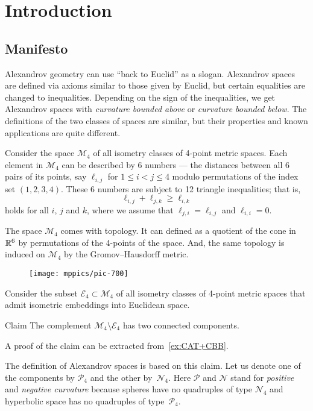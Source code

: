 \chapter{Introduction}

\section{Manifesto}

Alexandrov geometry can use ``back to Euclid'' as a slogan.
Alexandrov spaces are defined via axioms similar to those given by Euclid,
but certain  equalities are changed to inequalities. 
Depending on the sign of the inequalities, we get Alexandrov spaces with {}\emph{curvature bounded above} or {}\emph{curvature bounded below}.
The definitions of the two classes of spaces are similar, but their properties and known applications are quite different.


Consider the space $\mathcal{M}_4$ of all isometry classes of 4-point metric spaces.
Each element in $\mathcal{M}_4$ can be described by 6 numbers 
 --- the distances between all 6 pairs of its points, say $\ell_{i,j}$ for $1\le i< j\le 4$ modulo permutations of the index set $(1,2,3,4)$.
These 6 numbers are subject to 12 triangle inequalities; that is,
\[\ell_{i,j}+\ell_{j,k}\ge \ell_{i,k}\]
holds for all $i$, $j$ and $k$, where we assume that $\ell_{j,i}=\ell_{i,j}$ and $\ell_{i,i}=0$.

The space $\mathcal{M}_4$ comes with topology.
It can defined as a quotient of the cone in $\mathbb{R}^6$ by permutations of the 4-points of the space.
And, the same topology is induced on $\mathcal{M}_4$ by the Gromov--Hausdorff metric.

\begin{wrapfigure}[7]{o}{33mm}
\vskip-0mm
\centering
\texttt{[image: mppics/pic-700]}
\end{wrapfigure}

Consider the subset $\mathcal{E}_4\subset \mathcal{M}_4$ of all isometry classes of 4-point metric spaces that admit isometric embeddings into Euclidean space.

\begin{thm}{Claim}\label{clm:two-components-of-M4}
The complement $\mathcal{M}_4\setminus \mathcal{E}_4$ has two connected components.
\end{thm}

A proof of the claim can be extracted from~\ref{ex:CAT+CBB}.

The definition of Alexandrov spaces is based on this claim.
Let us denote one of the components by $\mathcal{P}_4$ and the other by~$\mathcal{N}_4$.
Here $\mathcal{P}$ and $\mathcal{N}$ stand for {}\emph{positive} 
and {}\emph{negative curvature} because spheres have no quadruples of type $\mathcal{N}_4$ and 
hyperbolic space
has no quadruples of type~$\mathcal{P}_4$.

